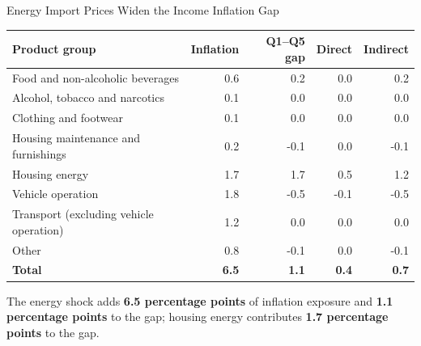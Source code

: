 \documentclass[11pt,aspectratio=169]{beamer}
\begin{document}
\begin{frame}{Energy Import Prices Widen the Income Inflation Gap}
\centering\small\setlength{\tabcolsep}{3pt}
\begin{tabular}{lrrrr}
\toprule
Product group & Inflation & Q1--Q5 gap & Direct & Indirect\\
\midrule
Food and non-alcoholic beverages & 0.6 & 0.2 & 0.0 & 0.2\\
Alcohol, tobacco and narcotics & 0.1 & 0.0 & 0.0 & 0.0\\
Clothing and footwear & 0.1 & 0.0 & 0.0 & 0.0\\
Housing maintenance and furnishings & 0.2 & -0.1 & 0.0 & -0.1\\
Housing energy & 1.7 & 1.7 & 0.5 & 1.2\\
Vehicle operation & 1.8 & -0.5 & -0.1 & -0.5\\
Transport (excluding vehicle operation) & 1.2 & 0.0 & 0.0 & 0.0\\
Other & 0.8 & -0.1 & 0.0 & -0.1\\
\midrule
\textbf{Total} & \textbf{6.5} & \textbf{1.1} & \textbf{0.4} & \textbf{0.7}\\
\bottomrule
\end{tabular}
\par\medskip\raggedright\small
The energy shock adds \textbf{6.5 percentage points} of inflation exposure and \textbf{1.1 percentage points} to the gap; housing energy contributes \textbf{1.7 percentage points} to the gap.
\end{frame}

\end{document}
